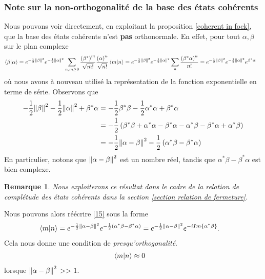 \documentclass[11pt,oneside,a4paper]{article}
\newtheorem{remark}[theorem]{Remarque}
\begin{document}
\subsubsection{Note sur la non-orthogonalité de la base des états cohérents}
Nous pouvons voir directement, en exploitant la proposition \ref{coherent in fock}, que la base des états cohérents n'est \textbf{pas} orthonormale. En effet, pour tout $\alpha,\beta$ sur le plan complexe
\begin{align}
  \braket{\beta}{\alpha} &= e^{-\frac{1}{2}\norm{\beta}^2}e^{-\frac{1}{2}\norm{\alpha}^2}\sum_{n,m\geq 0}\frac{\left(\beta^*\right)^m}{\sqrt{m!}}\frac{\left(\alpha\right)^n}{\sqrt{n!}}\braket{m}{n}
  = e^{-\frac{1}{2}\norm{\beta}^2}e^{-\frac{1}{2}\norm{\alpha}^2} \sum_n \frac{\left(\beta^*\alpha\right)^n}{n!} = e^{-\frac{1}{2}\norm{\beta}^2}e^{-\frac{1}{2}\norm{\alpha}^2}e^{\beta^*\alpha}\label{15}
\end{align}
où nous avons à nouveau utilisé la représentation de la fonction exponentielle en terme de série. Observons que 
\begin{align}
  -\frac{1}{2}\norm{\beta}^2-\frac{1}{2}\norm{\alpha}^2+\beta^*\alpha &= -\frac{1}{2}\beta^*\beta - \frac{1}{2}\alpha^*\alpha+\beta^*\alpha\\
  &= -\frac{1}{2}\left(\beta^*\beta+\alpha^*\alpha-\beta^*\alpha-\alpha^*\beta-\beta^*\alpha+\alpha^*\beta\right)\\
  &= -\frac{1}{2}\norm{\alpha-\beta}^2-\frac{1}{2}\left(\alpha^*\beta-\beta^*\alpha\right)
\end{align}
En particulier, notons que $\norm{\alpha-\beta}^2$ est un nombre réel, tandis que $\alpha^*\beta-\beta^*\alpha$ est bien complexe. 

\begin{remark}
  Nous exploiterons ce résultat dans le cadre de la relation de complétude des états cohérents dans la section \ref{section relation de fermeture}.
\end{remark}

Nous pouvons alors réécrire \eqref{15} sous la forme
\begin{align}
  \braket{m}{n} &= e^{-\frac{1}{2}\norm{\alpha-\beta}^2}e^{-\frac{1}{2}\left(\alpha^*\beta-\beta^*\alpha\right)} = e^{-\frac{1}{2}\norm{\alpha-\beta}^2}e^{-iIm\left\{\alpha^*\beta\right\}}.
\end{align}
Cela nous donne une condition de \emph{presqu'orthogonalité}.
\begin{align}
  \braket{m}{n} &\approx 0
\end{align}
lorsque $\norm{\alpha-\beta}^2$ >> $1$.
\end{document}
